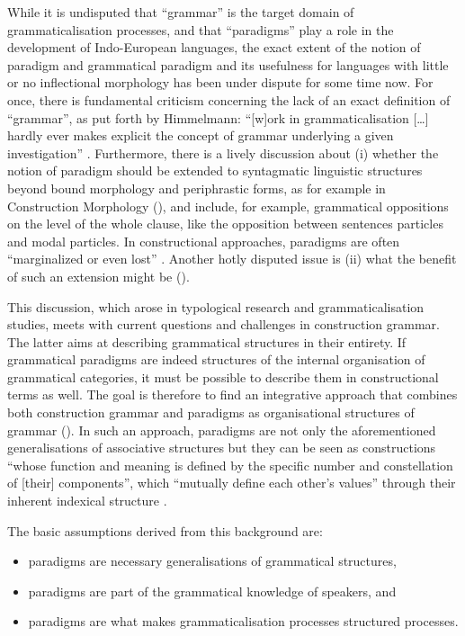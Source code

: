 \documentclass[output=paper]{langsci/langscibook}
\begin{document}
While it is undisputed that “grammar” is the target domain of grammaticalisation processes, and that “paradigms” play a role in the development of Indo-European languages, the exact extent of the notion of paradigm and grammatical paradigm and its usefulness for languages with little or no inflectional morphology has been under dispute for some time now. For once, there is fundamental criticism concerning the lack of an exact definition of “grammar”, as put forth by Himmelmann: “[w]ork in grammaticalisation […] hardly ever makes explicit the concept of grammar underlying a given investigation” \citep[2]{Himmelmann1992}. Furthermore, there is a lively discussion about (i) whether the notion of paradigm should be extended to syntagmatic linguistic structures beyond bound morphology and periphrastic forms, as for example in Construction Morphology (\citealt{Booij2010,Booij2016, Booij2018}), and include, for example, grammatical oppositions on the level of the whole clause, like the opposition between sentences particles and modal particles. In constructional approaches, paradigms are often “marginalized or even lost” \citep[277]{Diewald2020a}. Another hotly disputed issue is (ii) what the benefit of such an extension might be (\citealt{Bisang2014,Diewald2020a,Haspelmath2000,WiemerBisang2004}).

This discussion, which arose in typological research and grammaticalisation studies, meets with current questions and challenges in construction grammar. The latter aims at describing grammatical structures in their entirety. If grammatical paradigms are indeed structures of the internal organisation of grammatical categories, it must be possible to describe them in constructional terms as well. The goal is therefore to find an integrative approach that combines both construction grammar and paradigms as organisational structures of grammar (\citealt{Diewald2009, Diewald2015, Diewald2020a, DiewaldSmirnova2010, Politt2021}). In such an approach, paradigms are not only the aforementioned generalisations of associative structures but they can be seen as constructions “whose function and meaning is defined by the specific number and constellation of [their] components”, which “mutually define each other’s values” through their inherent indexical structure \citep[303]{Diewald2020a}.

The basic assumptions derived from this background are:\largerpage

\begin{itemize}
\item paradigms are necessary generalisations of grammatical structures,
\item paradigms are part of the grammatical knowledge of speakers, and
\item paradigms are what makes grammaticalisation processes structured processes.
\end{itemize}
\end{document}
